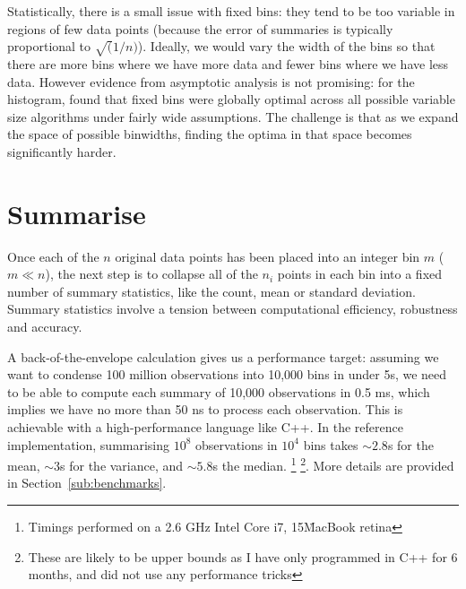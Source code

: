 \documentclass[journal]{vgtc}                %
\begin{document}
Statistically, there is a small issue with fixed bins: they tend to be too variable in regions of few data points (because the error of summaries is typically proportional to $\sqrt(1/n)$). Ideally, we would vary the width of the bins so that there are more bins where we have more data and fewer bins where we have less data. However evidence from asymptotic analysis is not promising: for the histogram, \cite{kogure:1987} found that fixed bins were globally optimal across all possible variable size algorithms under fairly wide assumptions. The challenge is that as we expand the space of possible binwidths, finding the optima in that space becomes significantly harder. 



\section{Summarise}
\label{sec:summarise}

Once each of the $n$ original data points has been placed into an integer bin $m$ ($m \ll n$), the next step is to collapse all of the $n_i$ points in each bin into a fixed number of summary statistics, like the count, mean or standard deviation. Summary statistics involve a tension between computational efficiency, robustness and accuracy.

A back-of-the-envelope calculation gives us a performance target: assuming we want to condense 100 million observations into 10,000 bins in under 5s, we need to be able to compute each summary of 10,000 observations in 0.5 ms, which implies we have no more than 50 ns to process each observation. This is achievable with a high-performance language like C++. In the reference implementation, summarising $10^8$ observations in $10^4$ bins takes $\sim 2.8$s for the mean, $\sim 3$s for the variance, and $\sim 5.8$s the median. \footnote{Timings performed on a 2.6 GHz Intel Core i7, 15\" MacBook retina} \footnote{These are likely to be upper bounds as I have only programmed in C++ for 6 months, and did not use any performance tricks}.  More details are provided in Section~\ref{sub:benchmarks}.
\end{document}

